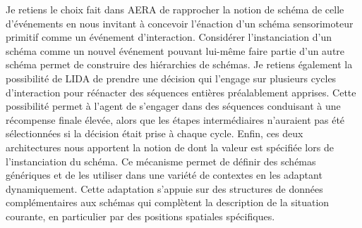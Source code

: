 









Je retiens le choix fait dans AERA de rapprocher la notion de schéma de celle d'événements en nous invitant à concevoir l'énaction d'un schéma sensorimoteur primitif comme un événement d'interaction.
Considérer l'instanciation d'un schéma comme un nouvel événement pouvant lui-même faire partie d'un autre schéma permet de construire des hiérarchies de schémas.
Je retiens également la possibilité de LIDA de prendre une décision qui l'engage sur plusieurs cycles d'interaction pour réénacter des séquences entières préalablement apprises.
Cette possibilité permet à l'agent de s'engager dans des séquences conduisant à une récompense finale élevée, alors que les étapes intermédiaires n'auraient pas été sélectionnées si la décision était prise à chaque cycle.
Enfin, ces deux architectures nous apportent la notion de  dont la valeur est spécifiée lors de l'instanciation du schéma. 
Ce mécanisme permet de définir des schémas génériques et de les utiliser dans une variété de contextes en les adaptant dynamiquement. 
Cette adaptation s'appuie sur des structures de données complémentaires aux schémas qui complètent la description de la situation courante, en particulier par des positions spatiales spécifiques. 

